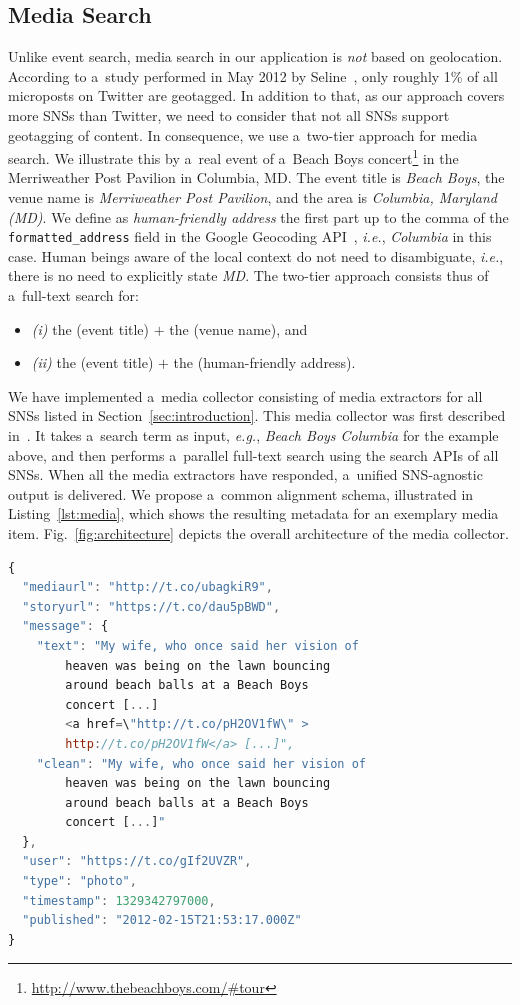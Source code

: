 \documentclass[runningheads,a4paper]{llncs}
\begin{document}
{\subsection{Media Search} \label{sec:media-search}
Unlike event search, media search in our application is \emph{not} based on geolocation. According to a~study performed in May 2012 by Seline~\cite{Quora2012},
only roughly 1\% of all microposts on Twitter are geotagged. In addition to that, as our approach covers more SNSs than Twitter, we need to consider that not all SNSs support geotagging of content. In consequence, we use a~two-tier approach for media search. We illustrate this by a~real event of a~Beach Boys concert\footnote{\url{http://www.thebeachboys.com/\#tour}} in the Merriweather Post Pavilion in Columbia, MD. The event title is \emph{Beach Boys},
the venue name is \emph{Merriweather Post Pavilion}, and the area is \emph{Columbia, Maryland (MD)}. We define as \emph{human-friendly address} the first part up to the comma of the \texttt{formatted\_address} field in the Google Geocoding API~\cite{Geocoding2012}, \emph{i.e.}, \emph{Columbia} in this case. Human beings aware of the local context do not need to disambiguate, \emph{i.e.}, there is no need to explicitly state \emph{MD}. The two-tier approach consists thus of a~full-text search for:
\begin{itemize}
 \item \emph{(i)} the (event title) $+$ the (venue name), and
 \item \emph{(ii)} the (event title) $+$ the (human-friendly address).
\end{itemize}

We have implemented a~media collector consisting of media extractors for all SNSs listed in Section~\ref{sec:introduction}.
This media collector was first described in~\cite{Khrouf2012}.
It takes a~search term as input, \emph{e.g.}, \emph{Beach Boys Columbia} for the example above, and then performs a~parallel full-text search using the search APIs of all SNSs. When all the media extractors have responded, a~unified SNS-agnostic output is delivered. We propose a~common alignment schema, illustrated in Listing~\ref{lst:media}, which shows the resulting metadata for an exemplary media item. Fig.~\ref{fig:architecture} depicts the overall architecture of the media collector.

\begin{lstlisting}[language=JavaScript,caption={Sample output of the media collector showing a~\mbox{Google+} post (edited for legibility, URLs shortened).},label={lst:media}]
{
  "mediaurl": "http://t.co/ubagkiR9",
  "storyurl": "https://t.co/dau5pBWD",
  "message": {
    "text": "My wife, who once said her vision of
        heaven was being on the lawn bouncing
        around beach balls at a Beach Boys
        concert [...]
        <a href=\"http://t.co/pH2OV1fW\" >
        http://t.co/pH2OV1fW</a> [...]",
    "clean": "My wife, who once said her vision of
        heaven was being on the lawn bouncing
        around beach balls at a Beach Boys
        concert [...]"
  },
  "user": "https://t.co/gIf2UVZR",
  "type": "photo",
  "timestamp": 1329342797000,
  "published": "2012-02-15T21:53:17.000Z"
}
\end{lstlisting}

}
\end{document}
